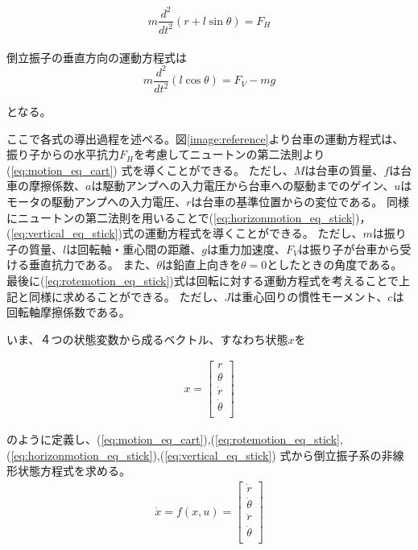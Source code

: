 	\begin{equation}
		m\frac{d^{2}}{dt^{2}}(r+l\sin\theta) = F_{H}
		\label{eq:horizonmotion_eq_stick}
	\end{equation}
	\\
	倒立振子の垂直方向の運動方程式は\\
	
	\begin{equation}
		m\frac{d^{2}}{dt^{2}}(l\cos\theta) = F_{V}-mg
		\label{eq:vertical_eq_stick}
	\end{equation}
	
	となる。
	\par
	ここで各式の導出過程を述べる。図\ref{image:reference}より台車の運動方程式は、振り子からの水平抗力$F_{H}$を考慮してニュートンの第二法則より(\ref{eq:motion_eq_cart})
	式を導くことができる。
	ただし、$M$は台車の質量、$f$は台車の摩擦係数、$a$は駆動アンプへの入力電圧から台車への駆動までのゲイン、$u$はモータの駆動アンプへの入力電圧、$r$は台車の基準位置からの変位である。
	同様にニュートンの第二法則を用いることで(\ref{eq:horizonmotion_eq_stick})，(\ref{eq:vertical_eq_stick})式の運動方程式を導くことができる。
	ただし、$m$は振り子の質量、$l$は回転軸・重心間の距離、$g$は重力加速度、$F_{V}$は振り子が台車から受ける垂直抗力である。
	また、$\theta$は鉛直上向きを$\theta=0$としたときの角度である。
	最後に(\ref{eq:rotemotion_eq_stick})式は回転に対する運動方程式を考えることで上記と同様に求めることができる。
	ただし、$J$は重心回りの慣性モーメント、$c$は回転軸摩擦係数である。
	\par
	いま、４つの状態変数から成るベクトル、すなわち状態$x$を
					
	\begin{eqnarray}
		x=\left[
		\begin{array}{ccc}
			r\\
			\theta\\
			\dot{r}\\
			\dot{\theta}\\
		\end{array}
		\right]
		\label{eq:array1}
	\end{eqnarray}
					
	のように定義し、(\ref{eq:motion_eq_cart}),(\ref{eq:rotemotion_eq_stick},
	(\ref{eq:horizonmotion_eq_stick}),(\ref{eq:vertical_eq_stick})
	式から倒立振子系の非線形状態方程式を求める。
	\begin{eqnarray}
		\dot{x} = f(x,u) = \left[
		\begin{array}{ccc}
			\dot{r}\\
			\dot{\theta}\\
			\ddot{r}\\
			\ddot{\theta}\\
		\end{array}
		\right]
		\label{eq:array2}
	\end{eqnarray}
					

